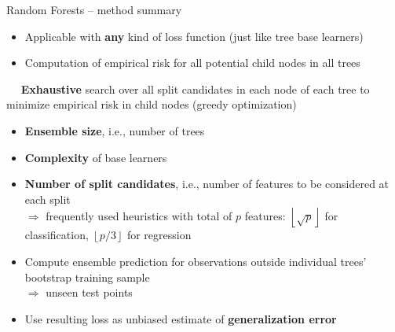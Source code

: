 \begin{frame}{Random Forests -- method summary}


\begin{itemize}
  \item Applicable with \textbf{any} kind of loss function (just like tree base 
  learners)
  \item Computation of empirical risk for all potential child nodes in all trees
\end{itemize}

\medskip

 ~~
\textbf{Exhaustive} search over all split candidates in each node of each tree
to minimize empirical risk in child nodes (greedy optimization) \\

\medskip


\begin{itemize}
  \item \textbf{Ensemble size}, i.e., number of trees
  \item \textbf{Complexity} of base learners
  \item \textbf{Number of split candidates}, i.e., number of features to be
  considered at each split \\
  $\Rightarrow$ frequently used heuristics with total of $p$ features: 
  $\left \lfloor{\sqrt{p}}\right \rfloor$ for classification,
  $\left \lfloor{p/3}\right \rfloor$ for regression
\end{itemize}

\medskip

\begin{itemize}
  \item Compute ensemble prediction for observations outside individual 
  trees' bootstrap training sample \\ $\Rightarrow$ unseen test points
  \item Use resulting loss as unbiased estimate of \textbf{generalization error}
\end{itemize}

  
\end{frame}


